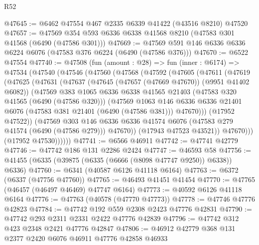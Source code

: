\begin{lexlean}{R52}
\begin{coremodule}
@47645 := @6462 @47554 @467 @2335 @6339 @41422 (@43516 @8210) @47520
@47657 := @47569 @354 @593 @6336 @6338 @41568 @8210 (@47583 @301 @41568 (@6490 (@47586 @301)))
@47669 := @47569 @591 @146 @6336 @6336 @6224 @6076 (@47583 @376 @6224 (@6490 (@47586 @376)))
@47670 := @6522 @47554
@47740 := @47508
    (fun (amount : @28) =>
    fun (inner : @6174) =>
    @47534
      (@47540
        (@47546
          (@47560
            (@47568
              (@47592
                (@47605
                  (@47611
                    (@47619
                      (@47625
                        (@47631
                          (@47637
                            (@47645 (@47657 (@47669 @47670)) (@9951 @41402 @6082))
                            (@47569
                              @383
                              @1065
                              @6336
                              @6338
                              @41565
                              @21403
                              (@47583 @320 @41565 (@6490 (@47586 @320)))
                              (@47569
                                @1063
                                @146
                                @6336
                                @6336
                                @21401
                                @6076
                                (@47583 @381 @21401 (@6490 (@47586 @381)))
                                @47670)))
                          (@17952 @47522))
                        (@47569
                          @303
                          @146
                          @6336
                          @6336
                          @41574
                          @6076
                          (@47583 @279 @41574 (@6490 (@47586 @279)))
                          @47670))
                      (@17943 @47523 @43521))
                    @47670)))
              (@17952 @47530))))))
@47741 := @6566 @46911
@47742 := @47741 @42779
@47746 := @47742 @186 @131 @2286 @2424
@47747 := @46593 @58
@47756 := @41455 (@6335 (@39875 (@6335 (@6666 (@8098 @47747 @9250)) @6338)) @6336)
@47760 := @6341 (@40587 @6126 @41118 @6164)
@47763 := @6372 (@6337 (@47756 @47760))
@47765 := @46493 @41451 @41454
@47770 := @47765 (@46457 (@46497 @46469) @47747 @6164)
@47773 := @40592 @6126 @41118 @6164
@47776 := @47763 (@40578 (@47770 @47773))
@47778 := @47746 @47776 @42823
@47784 := @47742 @192 @559 @2308 @2423 @47776 @42831
@47790 := @47742 @293 @2311 @2331 @2422 @47776 @42839
@47796 := @47742 @312 @423 @2348 @2421 @47776 @42847
@47806 := @46912 @42779 @368 @131 @2377 @2420 @6076 @46911 @47776 @42858 @46933

\end{coremodule}
\end{lexlean}
